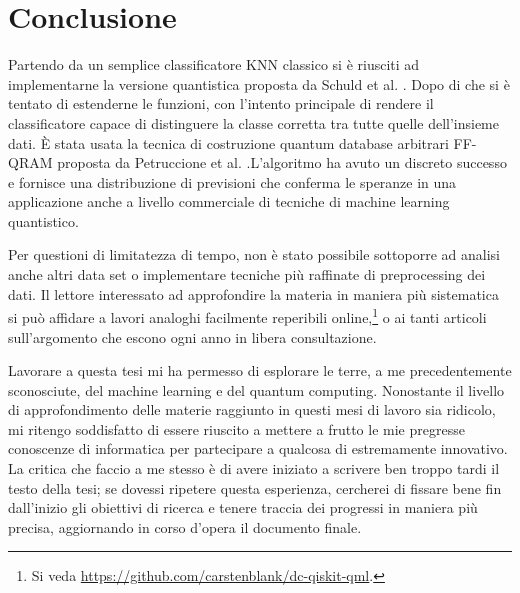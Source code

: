 \chapter{Conclusione}\label{ch:conclusione}

Partendo da un semplice classificatore \ac{KNN} classico 
si è riusciti ad implementarne la versione quantistica proposta 
da Schuld et al. \cite{schuld}. Dopo di che si è tentato di 
estenderne le funzioni, con l'intento principale di rendere il 
classificatore capace di distinguere la classe corretta tra 
tutte quelle dell'insieme dati. È stata usata la tecnica di 
costruzione quantum database arbitrari \ac{FF-QRAM} proposta da 
Petruccione et al. \cite{petruccione}.L'algoritmo ha avuto un 
discreto successo e fornisce una distribuzione di previsioni 
che conferma le speranze in una applicazione anche a livello 
commerciale di tecniche di machine learning quantistico. 

Per questioni di limitatezza di tempo, non è stato possibile 
sottoporre ad analisi anche altri data set o implementare tecniche 
più raffinate di preprocessing dei dati. Il lettore interessato 
ad approfondire la materia in maniera più sistematica si può 
affidare a lavori analoghi facilmente reperibili 
online,\footnote{Si veda 
\url{https://github.com/carstenblank/dc-qiskit-qml}.} o ai tanti 
articoli sull'argomento che escono ogni anno in libera consultazione. 


Lavorare a questa tesi mi ha permesso di esplorare le terre, 
a me precedentemente sconosciute, del machine learning e del 
quantum computing. Nonostante il livello di approfondimento 
delle materie raggiunto in questi mesi di lavoro sia ridicolo, 
mi ritengo soddisfatto di essere riuscito a mettere a frutto 
le mie pregresse conoscenze di informatica per partecipare a 
qualcosa di estremamente innovativo. La critica che faccio a 
me stesso è di avere iniziato a scrivere ben troppo tardi il 
testo della tesi; se dovessi ripetere questa esperienza, 
cercherei di fissare bene fin dall'inizio gli obiettivi di 
ricerca e tenere traccia dei progressi in maniera più precisa, 
aggiornando in corso d'opera il documento finale. 